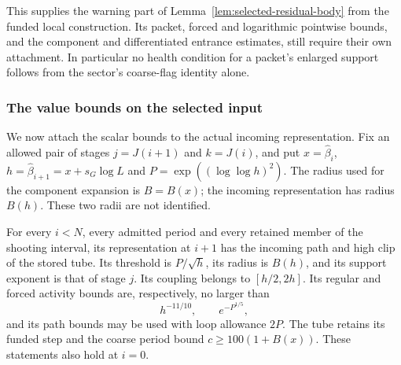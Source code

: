 This supplies the warning part of Lemma~\ref{lem:selected-residual-body}
from the funded local construction. Its packet, forced and logarithmic
pointwise bounds, and the component and differentiated entrance
estimates, still require their own attachment. In particular no health
condition for a packet's enlarged support follows from the sector's
coarse-flag identity alone.

\subsubsection{The value bounds on the selected input}
\label{sec:selected-value-prices}

We now attach the scalar bounds to the actual incoming representation.
Fix an allowed pair of stages $j=J(i+1)$ and $k=J(i)$, and put
$x=\widehat\beta_i$, $h=\widehat\beta_{i+1}=x+s_G\log L$ and
$P=\exp((\log\log h)^2)$. The radius used for the component expansion
is $B=B(x)$; the incoming representation has radius $B(h)$.
These two radii are not identified.

\begin{lemma}
\label{lem:selected-value-input}
For every $i<N$, every admitted period and every retained member of the
shooting interval, its representation at $i+1$ has the incoming path
and high clip of the stored tube. Its threshold is $P/\sqrt h$, its
radius is $B(h)$, and its support exponent is that of stage $j$.
Its coupling belongs to $[h/2,2h]$. Its regular and forced activity
bounds are, respectively, no larger than
\[
                   h^{-11/10},\qquad e^{-P^{1/5}},
\]
and its path bounds may be used with loop allowance $2P$.
The tube retains its funded step and the coarse period bound
$c\ge100(1+B(x))$. These statements also hold at $i=0$.
\end{lemma}

